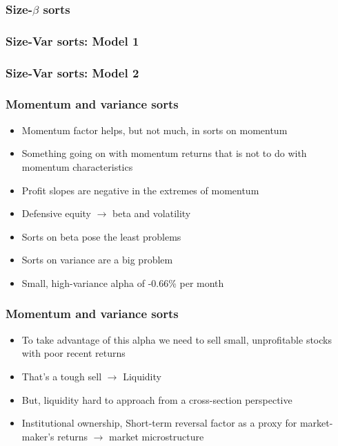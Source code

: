 \documentclass[notes]{beamer}  %
\begin{document}
\begin{frame}
  \frametitle{Size-$\beta$ sorts}
  \begin{center}
  \resizebox*{!}{\dimexpr\textheight-1.3cm\relax}{
    
    }
  \end{center}
\end{frame}


\begin{frame}
  \frametitle{Size-Var sorts: Model 1}
  \begin{center}
  \resizebox*{!}{\dimexpr\textheight-1.3cm\relax}{
    
    }
  \end{center}
\end{frame}


\begin{frame}
  \frametitle{Size-Var sorts: Model 2}
  \begin{center}
  \resizebox*{!}{\dimexpr\textheight-1.3cm\relax}{
    
    }
  \end{center}
\end{frame}

\begin{frame}
\frametitle{Momentum and variance sorts}
\begin{itemize}
    \item Momentum factor helps, but not much, in sorts on momentum
    \item Something going on with momentum returns that is not to do with
    momentum characteristics
    \item Profit slopes are negative in the extremes of momentum
    \item Defensive equity $\rightarrow$ beta and volatility
    \item Sorts on beta pose the least problems
    \item Sorts on variance are a big problem
    \item Small, high-variance alpha of -0.66\% per month
\end{itemize}
\end{frame}

\begin{frame}
\frametitle{Momentum and variance sorts}
\begin{itemize}
    \item To take advantage of this alpha we need to sell small,
    unprofitable stocks with poor recent returns
    \item That's a tough sell $\rightarrow$ Liquidity
    \item But, liquidity hard to approach from a cross-section perspective
    \item Institutional ownership, Short-term reversal factor as a proxy
    for market-maker's returns $\rightarrow$ market microstructure
\end{itemize}
\end{frame}
\end{document}
